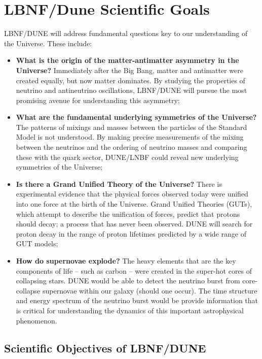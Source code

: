 \chapter{LBNF/Dune Scientific Goals}
\label{ch:physics-goals}

LBNF/DUNE will address fundamental questions key to our understanding of the Universe. These include:
\begin{itemize}
   \item {\bf What is the origin of the matter-antimatter asymmetry in the Universe?} Immediately after
                    the Big Bang, matter and antimatter were created equally, but now matter dominates.
                    By studying the properties of neutrino and antineutrino oscillations, LBNF/DUNE 
                    will pursue the most promising avenue for understanding this asymmetry;
   \item {\bf What are the fundamental underlying symmetries of the Universe?} The patterns of mixings and masses between the particles of the Standard Model is not understood. By making precise measurements of the mixing between the neutrinos and the ordering of neutrino masses and comparing these with the quark sector, DUNE/LNBF could reveal new underlying symmetries of the Universe;
  \item{\bf  Is there a Grand Unified Theory of the Universe?} There is experimental evidence that the
                 physical forces observed today were unified into one force at the birth of the Universe.
                Grand Unified Theories (GUTs), which attempt to describe the unification of forces,
                predict that protons should decay; a process that has never been observed. DUNE will 
                search for proton decay in the range of proton lifetimes predicted by a wide range of GUT models;
   \item{\bf How do supernovae explode?} The heavy elements that are the key components of life --
             such as carbon -- were created in the super-hot cores of collapsing stars. DUNE
             would be able to detect the neutrino burst from core-collapse supernovae within our galaxy (should one occur). 
             The time structure and energy spectrum of the neutrino burst would be
              provide information that is critical for understanding the dynamics of this important astrophysical
             phenomenon.
\end{itemize}

\section{Scientific Objectives of LBNF/DUNE}

